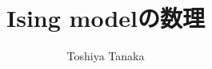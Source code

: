 \documentclass[dvipdfmx]{beamer}
\author[T. Tanaka]{Toshiya Tanaka}
\institute[Univ. Toyama]{University of Toyama}
\title[\textcolor{white}{Ising model}]{Ising modelの数理}
\theoremstyle{break}
\begin{document}
\begin{frame}
		\maketitle
\end{frame}

\
\end{document}
